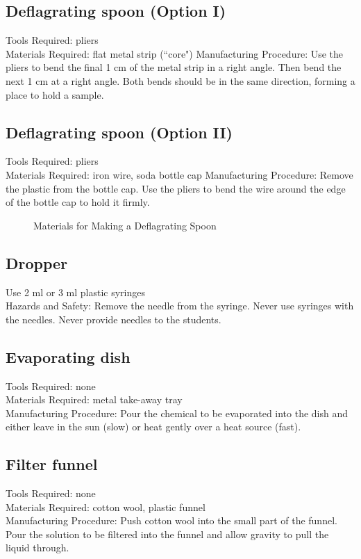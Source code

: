 \subsection*{Deflagrating spoon (Option I)}
Tools Required: pliers\\
Materials Required: flat metal strip (``core")
Manufacturing Procedure: Use the pliers to bend the final 1 cm of the metal strip in a right angle. Then bend the next 1 cm at a right angle. Both bends should be in the same direction, forming a place to hold a sample.



\subsection*{Deflagrating spoon (Option II)}
Tools Required: pliers\\
Materials Required: iron wire, soda bottle cap
Manufacturing Procedure: Remove the plastic from the bottle cap. Use the pliers to bend the wire around the edge of the bottle cap to hold it firmly.



\begin{figure}[h]
\begin{center}
\def\svgwidth{50pt}

\caption{Materials for Making a Deflagrating Spoon}
\end{center}
\end{figure}

\subsection*{Dropper}
Use 2 ml or 3 ml plastic syringes
\\Hazards and Safety: Remove the needle from the syringe. Never use syringes with the needles. Never provide needles to the students.

\subsection*{Evaporating dish}
Tools Required: none\\
Materials Required: metal take-away tray\\
Manufacturing Procedure: Pour the chemical to be evaporated into the dish and either leave in the sun (slow) or heat gently over a heat source (fast).

\subsection*{Filter funnel}
Tools Required: none\\
Materials Required: cotton wool, plastic funnel\\
Manufacturing Procedure: Push cotton wool into the small part of the funnel. Pour the solution to be filtered into the funnel and allow gravity to pull the liquid through.

